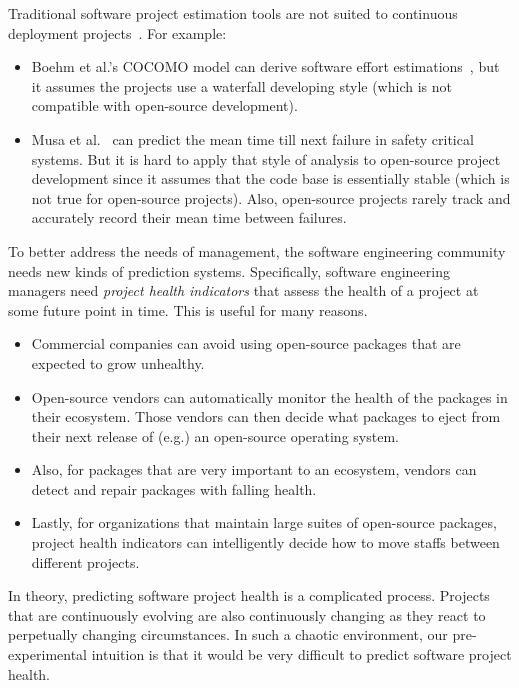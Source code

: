 \documentclass[sigconf,review,anonymous]{acmart}
\newcommand{\bi}{\begin{itemize}}
\newcommand{\ei}{\end{itemize}}
\begin{document}
Traditional software project estimation tools are not suited to continuous deployment projects~\cite{alexander2002working,llanos2012differences,shin2013can}. 
For example:
\bi
\item
Boehm et al.'s COCOMO model can derive    software effort estimations~\cite{boehm2000cost}, but it assumes the projects use a waterfall developing style
(which is not compatible with open-source development). 
\item
 Musa et al.~\cite{musa1993operational}
can  predict the mean time till next failure in safety critical systems. But it is hard to apply that  style of analysis   to  open-source project development since it assumes that the code base is essentially stable (which is not true for open-source projects).
Also,     open-source projects rarely track and  accurately record their mean time between failures.
\ei
To better address the needs of management, the software engineering community needs new kinds of prediction systems.
Specifically, software engineering
managers need {\em project health indicators} that  assess the health of a project
at some future point in time. This is useful for many reasons.
\bi
\item Commercial companies can avoid using open-source packages that are expected to grow unhealthy.
\item Open-source vendors can  automatically monitor the health of the packages in their ecosystem. Those vendors can then decide what packages to eject from their next release of (e.g.) an open-source operating system.
\item Also, for packages that are very important to an ecosystem,  vendors
can detect and repair  packages with falling health.
\item Lastly, for organizations that maintain large suites of open-source packages, project health indicators can intelligently decide how to move staffs between different projects.
\ei
In theory, predicting software project health is a complicated process. Projects that are continuously evolving are also continuously changing as they react to perpetually changing circumstances. In such  a chaotic environment, our pre-experimental intuition is that it would be very difficult to predict software project health.
\end{document}
